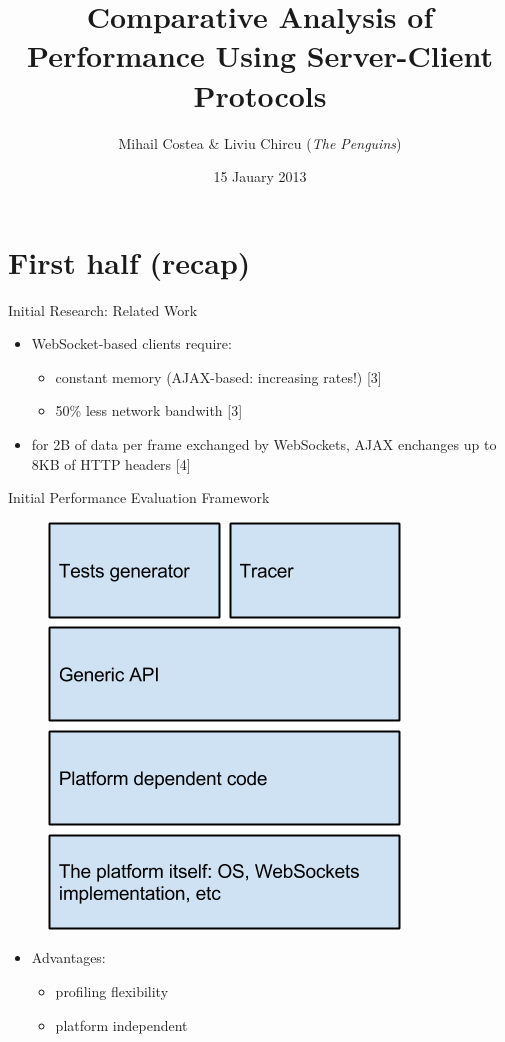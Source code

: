 \documentclass{soa.cs.pub.ro}
\title[Performance of Web Protocols]{Comparative Analysis of Performance Using
Server-Client Protocols}
\subtitle{Mihail Costea \& Liviu Chircu (\textit{The Penguins})}
\date{15 Jauary 2013}
\begin{document}
\frame{\titlepage}

\frame{\tableofcontents}

\section{First half (recap)}

\begin{frame}{Initial Research: Related Work}
  \begin{itemize}
    \item WebSocket-based clients require:
      \begin{itemize}
        \item constant memory (AJAX-based: increasing rates!) [3]
        \item 50\% less network bandwith [3]
      \end{itemize}
    \item for 2B of data per frame exchanged by WebSockets, AJAX enchanges
      up to 8KB of HTTP headers [4]
  \end{itemize}
\end{frame}

\begin{frame}{Initial Performance Evaluation Framework}
  \begin{figure}
     \includegraphics[scale=0.32]{img/architecture.png}
  \end{figure}
  \begin{itemize}
    \item Advantages:
      \begin{itemize}
        \item profiling flexibility
        \item platform independent
      \end{itemize}
  \end{itemize}
\end{frame}
\end{document}
